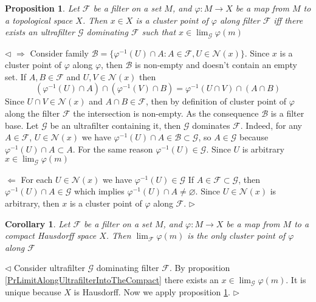 \documentclass[12pt]{article}
\newtheorem{proposition}[theorem]{Proposition}
\newtheorem{corollary}[theorem]{Corollary}
\newenvironment{proof}{\par $\triangleleft$}{$\triangleright$}
\begin{document}
\begin{proposition}\label{PrClusterPointAlongTheFilterCriterion} Let $\mathcal{F}$ be a filter on  a set $M$, and $\varphi:M\to X$ be a map from $M$ to a topological space $X$. Then $x\in X$ is a cluster point of $\varphi$ along filter $\mathcal{F}$ iff there exists an ultrafilter $\mathcal{G}$ dominating $\mathcal{F}$ such that $x\in\lim_{\mathcal{G}}\varphi(m)$
\end{proposition}
\begin{proof} $\Longrightarrow$ Consider family $\mathcal{B}=\{\varphi^{-1}(U)\cap A: A\in\mathcal{F}, U\in\mathcal{N}(x)\}$. Since $x$ is a cluster point of $\varphi$ along $\varphi$, then $\mathcal{B}$ is non-empty and doesn't contain an empty set. If $A,B\in\mathcal{F}$ and $U,V\in\mathcal{N}(x)$ then 
$$
(\varphi^{-1}(U)\cap A)\cap(\varphi^{-1}(V)\cap B)
=\varphi^{-1}(U\cap V)\cap (A\cap B) 
$$
Since $U\cap V\in\mathcal{N}(x)$ and $A\cap B\in\mathcal{F}$, then by definition of  cluster point of $\varphi$ along the filter $\mathcal{F}$ the intersection is non-empty. As the consequence $\mathcal{B}$ is a filter base. Let $\mathcal{G}$ be an ultrafilter containing it, then $\mathcal{G}$ dominates $\mathcal{F}$. Indeed, for any $A\in\mathcal{F}$, $U\in\mathcal{N}(x)$ we have $\varphi^{-1}(U)\cap A\in\mathcal{B}\subset\mathcal{G}$, so $A\in\mathcal{G}$ because $\varphi^{-1}(U)\cap A\subset A$. For the same reason $\varphi^{-1}(U)\in\mathcal{G}$. Since $U$ is arbitrary $x\in\lim_{\mathcal{G}}\varphi(m)$ 

$\Longleftarrow$  For each $U\in\mathcal{N}(x)$ we have $\varphi^{-1}(U)\in\mathcal{G}$ If $A\in\mathcal{F}\subset \mathcal{G}$, then $\varphi^{-1}(U)\cap A\in\mathcal{G}$ which implies $\varphi^{-1}(U)\cap A\neq \varnothing$.
Since $U\in\mathcal{N}(x)$ is arbitrary, then $x$ is a cluster point of $\varphi$ along $\mathcal{F}$.
\end{proof}

\begin{corollary}\label{CorClusterPintAreLimitsAlongUltrafilters} Let $\mathcal{F}$ be a filter on  a set $M$, and $\varphi:M\to X$ be a map from $M$ to a compact Hausdorff space $X$. Then $\lim_{\mathcal{F}} \varphi(m)$ is the only cluster point of $\varphi$ along $\mathcal{F}$
\end{corollary}
\begin{proof} Consider ultrafilter $\mathcal{G}$ dominating filter $\mathcal{F}$. By proposition \ref{PrLimitAlongUltrafilterIntoTheCompact} there exists an $x\in\lim_{\mathcal{G}}\varphi(m)$. It is unique because $X$ is Hausdorff. Now we apply proposition \ref{PrClusterPointAlongTheFilterCriterion}. 
\end{proof}
\end{document}
